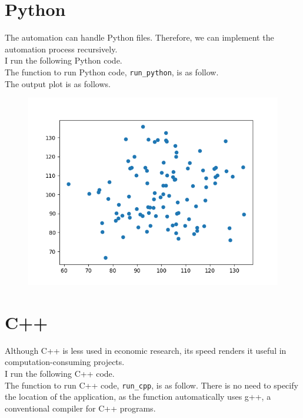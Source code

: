 \documentclass[12pt, a4paper]{article}
\begin{document}
\section{Python}

The automation can handle Python files. Therefore, we can implement the automation process recursively.\\

I run the following Python code.\\



The function to run Python code, \texttt{run\_python}, is as follow.\\



The output plot is as follows.\\

\begin{figure}[H]
	\includegraphics[width=.5\textwidth]{sample_python_graph.png}
\end{figure}

\section{C++}

Although C++ is less used in economic research, its speed renders it useful in computation-consuming projects.\\

I run the following C++ code.\\



The function to run C++ code, \texttt{run\_cpp}, is as follow. There is no need to specify the location of the application, as the function automatically uses g++, a conventional compiler for C++ programs.\\
\end{document}
